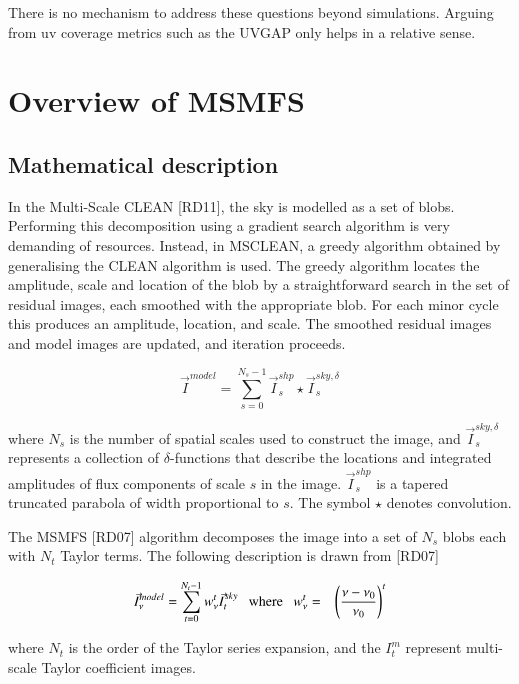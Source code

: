 \documentclass[11pt,a4paper,variablewidth]{article}
\begin{document}
There is no mechanism to address these questions beyond simulations. Arguing from uv coverage metrics such as the UVGAP only helps in a relative sense.


\clearpage

\section{Overview of MSMFS}
\label{sec:overview}

\subsection{Mathematical description}

In the Multi-Scale CLEAN [RD11], the sky is modelled as a set of blobs. Performing this decomposition using a gradient search algorithm is very demanding of resources. Instead, in MSCLEAN, a greedy algorithm obtained by generalising the CLEAN algorithm is used. The greedy algorithm locates the amplitude, scale and location of the blob by a straightforward search in the set of residual images, each smoothed with the appropriate blob. For each minor cycle this produces an amplitude, location, and scale. The smoothed residual images and model images are updated, and iteration proceeds.

\begin{equation}
\vec{I}^{model} = \sum_{s=0}^{N_s-1}  \vec{I}^{shp}_{s} \star \vec{I}^{sky,\delta}_s
\label{Eq:ms_model}
\end{equation}

where $N_s$ is the number of spatial scales used to construct the image, and
$\vec{I}^{sky,\delta}_{s}$ represents a collection of $\delta$-functions that describe the locations
and integrated amplitudes of flux components of scale $s$ in the image. $\vec{I}^{shp}_s$ is a tapered truncated parabola of width proportional to $s$.
The symbol $\star$ denotes convolution. 

The MSMFS [RD07] algorithm decomposes the image into a set of $N_s$ blobs each with $N_t$ Taylor terms. The following description is drawn from [RD07]

\begin{eqnarray}
\label{eqn:mf_model}
\vec{I}^{model}_{\nu} = \sum_{t=0}^{N_t-1} {w_{\nu}^t} \vec{I}^{sky}_{t} ~~~\mathrm{where}~~~ {w_{\nu}^t}&=&{\left(\frac{\nu-\nu_0}{\nu_0}\right)}^t 
\end{eqnarray}

where $N_t$ is the order of the Taylor series expansion, and 
the $I^m_t$ represent multi-scale Taylor coefficient images.
\end{document}
